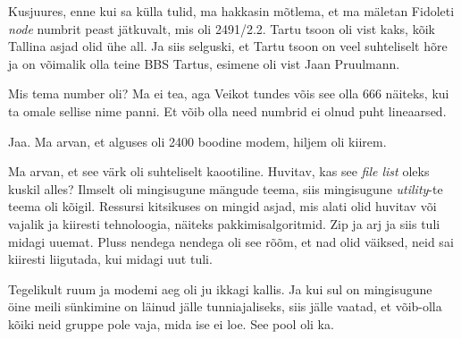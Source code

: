 Kusjuures, enne kui sa külla tulid, ma hakkasin mõtlema, et ma mäletan Fidoleti \emph{node} numbrit peast jätkuvalt, mis oli 2491/2.2. Tartu tsoon oli vist kaks, kõik Tallina asjad olid ühe all. Ja siis selguski, et Tartu tsoon on veel suhteliselt hõre ja on võimalik olla teine BBS Tartus, esimene oli vist Jaan Pruulmann.


Mis tema number oli? Ma ei tea, aga Veikot tundes võis see olla 666 näiteks, kui ta omale sellise nime panni. Et võib olla need numbrid ei olnud puht lineaarsed. 


Jaa. Ma arvan, et alguses oli 2400 boodine modem, hiljem oli kiirem.


Ma arvan, et see värk oli suhteliselt kaootiline. Huvitav, kas see \emph{file list} oleks kuskil alles? Ilmselt oli mingisugune mängude teema, siis mingisugune \emph{utility}-te teema oli kõigil. Ressursi kitsikuses on mingid asjad, mis alati olid  huvitav või vajalik ja kiiresti tehnoloogia, näiteks pakkimisalgoritmid. Zip ja arj ja siis tuli midagi uuemat. Pluss nendega nendega oli see rõõm, et nad olid väiksed, neid sai kiiresti liigutada, kui midagi uut tuli.


Tegelikult ruum ja modemi aeg oli ju ikkagi kallis. Ja kui sul on mingisugune öine meili sünkimine on läinud jälle tunniajaliseks, siis jälle vaatad, et võib-olla kõiki neid gruppe pole vaja, mida ise ei loe. See pool oli ka. 


